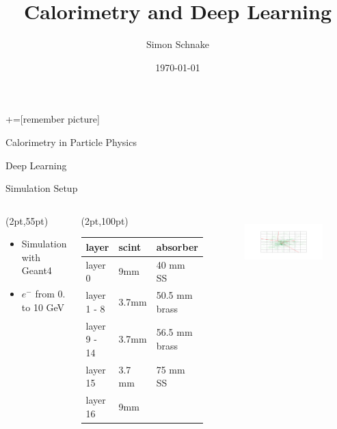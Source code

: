 \documentclass[10pt]{beamer}
\title{Calorimetry and Deep Learning}
\date{\today}
\author{Simon Schnake}
\institute{Universität Hamburg}
\begin{document}
\maketitle
{}+=[remember picture]
\begin{frame}{Calorimetry in Particle Physics}

\end{frame}

\begin{frame}{Deep Learning}

\end{frame}

\begin{frame}{Simulation Setup}
  \begin{columns}
    \begin{textblock*}{150pt}(2pt,55pt)
      \begin{itemize}
      \item Simulation with Geant4\small{}
      \item $e^-$ from 0. to 10 GeV
      \end{itemize}
    \end{textblock*}
    \begin{textblock*}{10pt}(2pt,100pt)
      \begin{tabular}{l|l|l}
        layer  & scint    & absorber \\ \hline
        layer 0      & 9mm     & 40 mm SS\\
        layer 1 - 8  & 3.7mm   & 50.5 mm brass        \\
        layer 9 - 14 & 3.7mm   & 56.5 mm brass         \\
        layer 15     & 3.7 mm  & 75 mm SS \\
        layer 16     & 9mm     &                      
      \end{tabular}
    \end{textblock*}
    \begin{figure}[htp]
      \includegraphics[width=1.1\textwidth]{front.png}\\

\end{figure}
\end{columns}
\end{frame}
\end{document}

